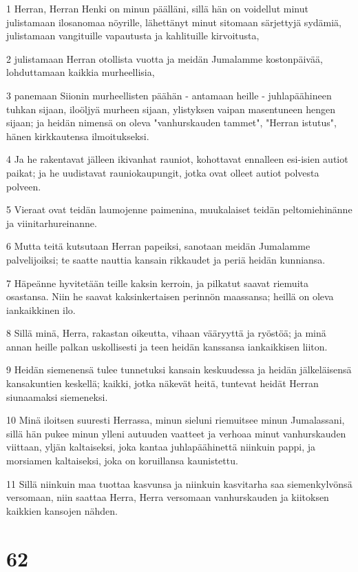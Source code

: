 \par 1 Herran, Herran Henki on minun päälläni, sillä hän on voidellut minut julistamaan ilosanomaa nöyrille, lähettänyt minut sitomaan särjettyjä sydämiä, julistamaan vangituille vapautusta ja kahlituille kirvoitusta,
\par 2 julistamaan Herran otollista vuotta ja meidän Jumalamme kostonpäivää, lohduttamaan kaikkia murheellisia,
\par 3 panemaan Siionin murheellisten päähän - antamaan heille - juhlapäähineen tuhkan sijaan, iloöljyä murheen sijaan, ylistyksen vaipan masentuneen hengen sijaan; ja heidän nimensä on oleva "vanhurskauden tammet", "Herran istutus", hänen kirkkautensa ilmoitukseksi.
\par 4 Ja he rakentavat jälleen ikivanhat rauniot, kohottavat ennalleen esi-isien autiot paikat; ja he uudistavat rauniokaupungit, jotka ovat olleet autiot polvesta polveen.
\par 5 Vieraat ovat teidän laumojenne paimenina, muukalaiset teidän peltomiehinänne ja viinitarhureinanne.
\par 6 Mutta teitä kutsutaan Herran papeiksi, sanotaan meidän Jumalamme palvelijoiksi; te saatte nauttia kansain rikkaudet ja periä heidän kunniansa.
\par 7 Häpeänne hyvitetään teille kaksin kerroin, ja pilkatut saavat riemuita osastansa. Niin he saavat kaksinkertaisen perinnön maassansa; heillä on oleva iankaikkinen ilo.
\par 8 Sillä minä, Herra, rakastan oikeutta, vihaan vääryyttä ja ryöstöä; ja minä annan heille palkan uskollisesti ja teen heidän kanssansa iankaikkisen liiton.
\par 9 Heidän siemenensä tulee tunnetuksi kansain keskuudessa ja heidän jälkeläisensä kansakuntien keskellä; kaikki, jotka näkevät heitä, tuntevat heidät Herran siunaamaksi siemeneksi.
\par 10 Minä iloitsen suuresti Herrassa, minun sieluni riemuitsee minun Jumalassani, sillä hän pukee minun ylleni autuuden vaatteet ja verhoaa minut vanhurskauden viittaan, yljän kaltaiseksi, joka kantaa juhlapäähinettä niinkuin pappi, ja morsiamen kaltaiseksi, joka on koruillansa kaunistettu.
\par 11 Sillä niinkuin maa tuottaa kasvunsa ja niinkuin kasvitarha saa siemenkylvönsä versomaan, niin saattaa Herra, Herra versomaan vanhurskauden ja kiitoksen kaikkien kansojen nähden.

\chapter{62}

